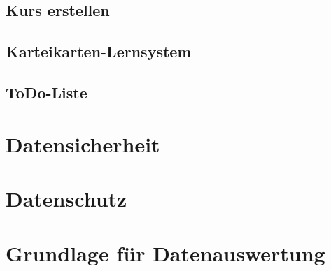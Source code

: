 \subsection{Kurs erstellen}
\subsection{Karteikarten-Lernsystem}
\subsection{ToDo-Liste}
\section{Datensicherheit}
\section{Datenschutz}
\section{Grundlage für Datenauswertung}
